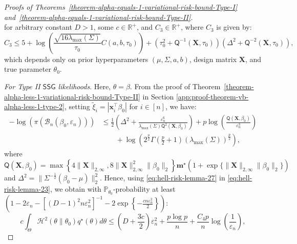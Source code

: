 \documentclass[12pt]{article}
\numberwithin{equation}{section}
\newcommand{\ssg}{\mathsf{SSG}}
\begin{document}
\begin{proof}[Proofs of Theorems~\ref{theorem-alpha-equals-1-variational-risk-bound-Type-I} and~\ref{theorem-alpha-equals-1-variational-risk-bound-Type-II}]
\begin{equation}
\end{equation}
for arbitrary constant $D>1$, some $c\in \mathbb{R}^{+}$, and $C_3\in \mathbb{R}^{+}$, where $C_3$ is given by:
\begin{equation}\label{eq:hell-risk-lemma-26}
C_3 \leq 5 + \log\left(\frac{\sqrt{16 \lambda_{\max}(\Sigma)}}{\tau_0}C(a, b, \tau_0)\right) + \left(\tau_0^2 + \mathsf{Q}^{-1}(\mathbf{X}, \tau_0)\right)\left(\Delta^2 + \mathsf{Q}^{-2}(\mathbf{X}, \tau_0)\right),
\end{equation}
which depends only on prior hyperparameters $(\mu, \Sigma, a, b)$, design matrix $\mathbf{X}$, and true parameter $\theta_0$.

\textit{For Type II $\ssg$ likelihoods}. Here, $\theta = \beta$. From the proof of Theorem~\ref{theorem-alpha-less-1-variational-risk-bound-Type-II} in Section \ref{app:proof-theorem-vb-alpha-less-1-type-2}, setting $\tilde{\xi}_i = |\mathbf{x}_i^{\top}\beta_0|$ for $i\in [n]$, we have:
\begin{equation}\label{eq:hell-risk-lemma-27}
\begin{split}
-\log (\pi\left(\mathcal{B}_n(\beta_0, \varepsilon_n)\right))
&\leq \frac{1}{2}\left(\Delta^2 + \frac{\varepsilon_n^6}{\lambda_{\mathrm{max}}(\Sigma)\mathsf{Q}^{2}(\mathbf{X}, \beta_0)}\right) + p\log\left(\frac{\mathsf{Q}(\mathbf{X},\beta_0)}{\varepsilon_n^3}\right)\\
&\qquad + \log\left(2^{\frac{p}{2}}\Gamma\left(\frac{p}{2}+1\right)(\lambda_{\mathrm{max}}(\Sigma))^{\frac{p}{2}}\right),
\end{split}
\end{equation}
where 
$\mathsf{Q}(\mathbf{X}, \beta_0) = \max\left\{4\lVert\mathbf{X}\rVert_{2, \infty}, 8\lVert\mathbf{X}\rVert_{2, \infty}^{2}\lVert\beta_0\rVert_{2}\right\}\mathbf{m}^{\star}\left(1 + \exp\{\lVert\mathbf{X}\rVert_{2, \infty}\lVert\beta_0\rVert_{2}\}\right)$ and $\Delta^{2} = \lVert \Sigma^{-\frac{1}{2}}(\beta_0-\mu)\rVert_{2}^{2}$. Hence, using \eqref{eq:hell-risk-lemma-27} in \eqref{eq:hell-risk-lemma-23}, we obtain with $\mathbb{P}_{\theta_0}$-probability at least $\left(1 - 2\varepsilon_n - [(D-1)^2n\varepsilon_n^2]^{-1} - 2\exp\left\{-\tfrac{c n \varepsilon_n^2}{2}\right\}\right)$:
\begin{equation}\label{eq:hell-risk-lemma-28}
\boxed{c\int_{\Theta}\mathcal{H}^{2}(\theta \parallel \theta_0) q^{\star}(\theta)d\theta \leq \left(D + \frac{3c}{2}\right)\varepsilon_n^2 + \frac{p\log p}{n} + \frac{C_4 p}{n}\log\left(\frac{1}{\varepsilon_n}\right)},

\end{equation}
\end{proof}
\end{document}
